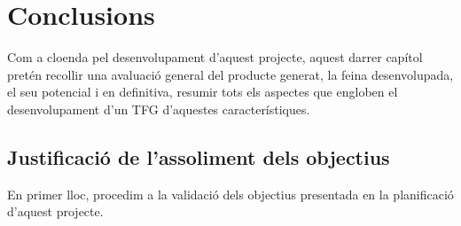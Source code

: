 
\chapter{Conclusions} %

\label{Conclusions} %

Com a cloenda pel desenvolupament d'aquest projecte, aquest darrer capítol pretén recollir una avaluació general del producte generat, la feina desenvolupada, el seu potencial i en definitiva, resumir tots els aspectes que engloben el desenvolupament d'un TFG d'aquestes característiques.

\section{Justificació de l'assoliment dels objectius}

En primer lloc, procedim a la validació dels objectius presentada en la planificació d'aquest projecte.

